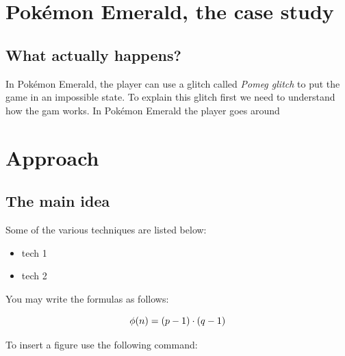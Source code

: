 \documentclass[a4paper]{usiinfbachelorproject}
\begin{document}
\section{\textbf{Pokémon Emerald, the case study}}
\subsection{\textbf{What actually happens?}}
In Pokémon Emerald, the player can use a glitch called \textit{Pomeg glitch} to put the game in an impossible state. To explain this glitch first we need to understand how the gam works. In Pokémon Emerald the player goes around


\section{\textbf{Approach}}
\subsection{\textbf{The main idea}}
Some of the various techniques are listed below:

\begin{itemize}
	\item tech 1
	\item tech 2
\end{itemize}

\noindent You may write the formulas as follows:

\begin{equation}
	\phi(n) = (p-1) \cdot (q-1)\\
\end{equation}




To insert a figure use the following command:
\end{document}
